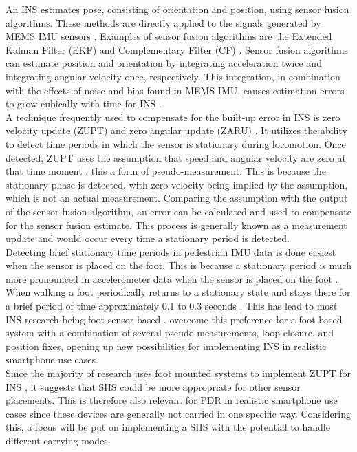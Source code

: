 An \ac{INS} estimates pose, consisting of orientation and position, using sensor fusion algorithms. These methods are directly applied to the signals generated by MEMS IMU sensors \cite{Wu2019}. Examples of sensor fusion algorithms are the Extended Kalman Filter (EKF) and Complementary Filter (CF) \cite{Kok2017}. Sensor fusion algorithms can estimate position and orientation by integrating acceleration twice and integrating angular velocity once, respectively. This integration, in combination with the effects of noise and bias found in MEMS IMU, causes estimation errors to grow cubically with time for INS \cite{Harle2013}. \\
\newline
A technique frequently used to compensate for the built-up error in INS is zero velocity update (ZUPT) and zero angular update (ZARU) \cite{Harle2013}. It utilizes the ability to detect time periods in which the sensor is stationary during locomotion. Once detected, ZUPT uses the assumption that speed and angular velocity are zero at that time moment \cite{Wu2019,Harle2013}. this a form of pseudo-measurement. This is because the stationary phase is detected, with zero velocity being implied by the assumption, which is not an actual measurement. Comparing the assumption with the output of the sensor fusion algorithm, an error can be calculated and used to compensate for the sensor fusion estimate. This process is generally known as a measurement update and would occur every time a stationary period is detected.\\
\newline
Detecting brief stationary time periods in pedestrian IMU data is done easiest when the sensor is placed on the foot. This is because a stationary period is much more pronounced in accelerometer data when the sensor is placed on the foot \cite{Yu2019,Wu2019}.  When walking a foot periodically returns to a stationary state and stays there for a brief period of time approximately 0.1 to 0.3 seconds \cite{Ren2016a}. This has lead to most \ac{INS} research being foot-sensor based \cite{Diez2018,Wu2019}.  \citet{Solin2018a} overcome this preference for a foot-based system with a combination of several pseudo measurements, loop closure, and position fixes, opening up new possibilities for implementing INS in realistic smartphone use cases.\\
Since the majority of research uses foot mounted systems to implement ZUPT for INS \cite{Wu2019}, it suggests that SHS could be more appropriate for other sensor placements. This is therefore also relevant for PDR in realistic smartphone use cases since these devices are generally not carried in one specific way. Considering this, a focus will be put on implementing a SHS with the potential to handle different carrying modes. \\


